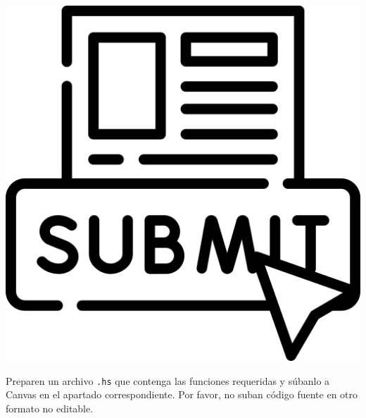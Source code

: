 \documentclass[]{article}
\theoremstyle{definition}
\begin{document}
\begin{minipage}{0.1\linewidth}
	\centering
	\includegraphics[scale = 0.06]{../img/submit}
\end{minipage}%
\begin{minipage}{0.85\linewidth}
	Preparen un archivo \texttt{.hs} que contenga las funciones requeridas y súbanlo a Canvas en el apartado correspondiente.
	Por favor, no suban código fuente en otro formato no editable.
\end{minipage}

\vspace{7ex}
\end{document}
